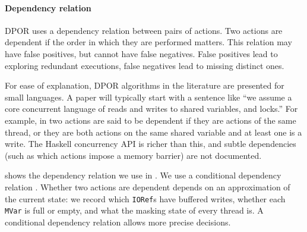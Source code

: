 \paragraph{Dependency relation}
DPOR uses a dependency relation between pairs of actions.  Two actions
are dependent if the order in which they are performed matters.  This
relation may have false positives, but cannot have false negatives.
False positives lead to exploring redundant executions, false
negatives lead to missing distinct ones.

For ease of explanation, DPOR algorithms in the literature are
presented for small languages.  A paper will typically start with a
sentence like ``we assume a core concurrent language of reads and
writes to shared variables, and locks.''  For example, in
\cite{coons2013} two actions are said to be dependent if they are
actions of the same thread, or they are both actions on the same
shared variable and at least one is a write.  The Haskell concurrency
API is richer than this, and subtle dependencies (such as which
actions impose a memory barrier) are not documented.

 shows the dependency relation we use in \dejafu{}.
We use a conditional dependency relation \parencite{godefroid1993}.
Whether two actions are dependent depends on an approximation of the
current state: we record which \verb|IORef|s have buffered writes,
whether each \verb|MVar| is full or empty, and what the masking state
of every thread is.  A conditional dependency relation allows more
precise decisions.

